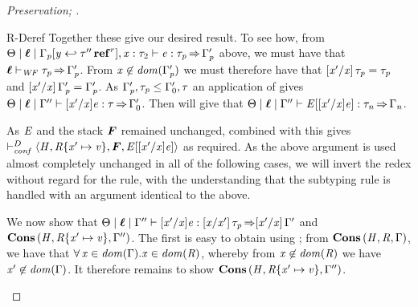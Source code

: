 \begin{proof}[Preservation; ]
\begin{rneqncase}{R-Deref}
    Together these give our desired result. To see how,
    from $ \Theta   \mid   \oldvec{\ell}   \mid   \Gamma_{\ottmv{p}}  \ottsym{[}  \mathit{y}  \hookleftarrow   \tau''  \TREF^{ r }   \ottsym{]}  \ottsym{,}  \mathit{x}  \ottsym{:}  \tau_{{\mathrm{2}}}   \vdash   \ottnt{e}  :  \tau_{\ottmv{p}}   \produces   \Gamma'_{\ottmv{p}} $ above,
    we must have that $ \oldvec{\ell}   \vdash _{\wf}  \tau_{\ottmv{p}}   \produces   \Gamma'_{\ottmv{p}} $.
    From $ \mathit{x}  \not\in \mathit{dom}( \Gamma'_{\mathit{p}} ) $ we must therefore have that
    $ [  \mathit{x'}  /  \mathit{x}  ]  \, \tau_{\mathit{p}}  =  \tau_{\mathit{p}}$ and $ [  \mathit{x'}  /  \mathit{x}  ]  \, \Gamma'_{\mathit{p}}  =  \Gamma'_{\mathit{p}}$. As $\Gamma'_{\mathit{p}}  ,  \tau_{\mathit{p}}  \leq  \Gamma'_{{\mathrm{0}}}  ,  \tau$
    an application of  gives
    $ \Theta   \mid   \oldvec{\ell}   \mid   \Gamma''   \vdash     [  \mathit{x'}  /  \mathit{x}  ]    \ottnt{e}   :  \tau   \produces   \Gamma'_{{\mathrm{0}}} $. Then 
    will give that $ \Theta   \mid   \oldvec{\ell}   \mid   \Gamma''   \vdash   \ottnt{E}  \ottsym{[}    [  \mathit{x'}  /  \mathit{x}  ]    \ottnt{e}   \ottsym{]}  :  \tau_{\ottmv{n}}   \produces   \Gamma_{\ottmv{n}} $.
    
    As $\mathit{E}$ and the stack $\oldvec{F}$ remained unchanged, combined with
     this gives
    $ \vdash_{\mathit{conf} }^D   \tuple{ \ottnt{H} ,  \ottnt{R}  \ottsym{\{}  \mathit{x'}  \mapsto  \ottnt{v}  \ottsym{\}} ,  \oldvec{F} ,  \ottnt{E}  \ottsym{[}    [  \mathit{x'}  /  \mathit{x}  ]    \ottnt{e}   \ottsym{]} }  $ as required.
    As the above argument is used almost completely unchanged
    in all of the following cases, we will invert the redex without regard
    for the  rule, with the understanding that the subtyping rule
    is handled with an argument identical to the above.
    
    We now show that $ \Theta   \mid   \oldvec{\ell}   \mid   \Gamma''   \vdash     [  \mathit{x'}  /  \mathit{x}  ]    \ottnt{e}   :   [  \mathit{x}  /  \mathit{x'}  ]  \, \tau_{\ottmv{p}}   \produces    [  \mathit{x'}  /  \mathit{x}  ]  \, \Gamma' $ and
    $\mathbf{Cons} \, (  \mathit{H}  ,  \mathit{R}  \{  \mathit{x'}  \mapsto  \mathit{v}  \}  ,  \Gamma''  )$.
    The first is easy to obtain using ; from $\mathbf{Cons} \, (  \mathit{H}  ,  \mathit{R}  ,  \Gamma  )$,
    we have that $\forall \,  \mathit{x}  \in \mathit{dom}( \Gamma )   .   \mathit{x}  \in   \mathit{dom}( \mathit{R} )  $, whereby from $ \mathit{x}  \not\in   \mathit{dom}( \mathit{R} )  $ we have
    $ \mathit{x'}  \not\in   \mathit{dom}( \Gamma )  $.
    It therefore remains to show $\mathbf{Cons} \, (  \mathit{H}  ,  \mathit{R}  \{  \mathit{x'}  \mapsto  \mathit{v}  \}  ,  \Gamma''  )$.


\end{rneqncase}
\end{proof}
